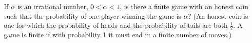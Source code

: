 If $\alpha$ is an irrational number, $0 < \alpha < 1$, is there a
finite game with an honest coin such that the probability of one player
winning the game is $\alpha$? (An honest coin is one for which the
probability of heads and the probability of tails are both $\frac12$.
A game is finite if with probability 1 it must end in a finite number of moves.)
